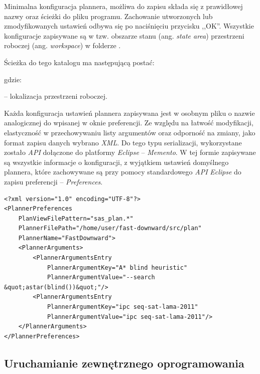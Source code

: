 Minimalna konfiguracja plannera, możliwa do zapisu składa się z prawidłowej nazwy oraz ścieżki do pliku programu. Zachowanie utworzonych lub zmodyfikowanych ustawień odbywa się po naciśnięciu przycisku ,,OK''.
Wszystkie konfiguracje zapisywane są w tzw. obszarze stanu (ang. \textit{state area}) przestrzeni roboczej (ang. \textit{workspace}) w folderze . 

Ścieżka do tego katalogu ma następującą postać:

\noindent
\centerline{}

\noindent
gdzie:

\noindent
\textbf{} -- lokalizacja przestrzeni roboczej.

Każda konfiguracja ustawień plannera zapisywana jest w osobnym pliku o nazwie analogicznej do wpisanej w oknie preferencji. Ze względu na łatwość modyfikacji, elastyczność w przechowywaniu listy argumentów oraz odporność na zmiany, jako format zapisu danych wybrano \textit{XML}. Do tego typu serializacji, wykorzystane zostało \textit{API} dołączone do platformy \textit{Eclipse} -- \textit{Memento}. W tej formie zapisywane są wszystkie informacje o konfiguracji, z wyjątkiem ustawień domyślnego plannera, które zachowywane są przy pomocy standardowego \textit{API} \textit{Eclipse} do zapisu preferencji -- \textit{Preferences}.

\lstset{language=XML}          %
\begin{lstlisting}[frame=single,label={lst:preferencje_plannera},caption={Przykładowa konfiguracja plannera FastDownward w postaci XML}]  % Start your code-block
<?xml version="1.0" encoding="UTF-8"?>
<PlannerPreferences 
	PlanViewFilePattern="sas_plan.*" 
	PlannerFilePath="/home/user/fast-downward/src/plan" 
	PlannerName="FastDownward">
	<PlannerArguments>
		<PlannerArgumentsEntry 
			PlannerArgumentKey="A* blind heuristic" 
			PlannerArgumentValue="--search &quot;astar(blind())&quot;"/>
		<PlannerArgumentsEntry 
			PlannerArgumentKey="ipc seq-sat-lama-2011" 
			PlannerArgumentValue="ipc seq-sat-lama-2011"/>
	</PlannerArguments>
</PlannerPreferences>
\end{lstlisting}

\subsection{Uruchamianie zewnętrznego oprogramowania}
\label{subsec:uruchamianie}

